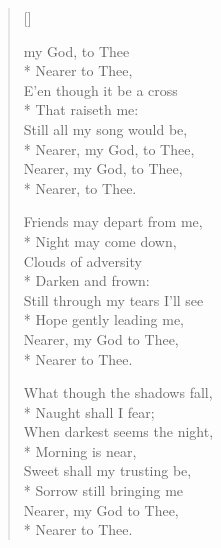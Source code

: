 \newHymn


\begin{verse}[\versewidth]

\begin{altverse}
 my God, to Thee\\*
Nearer to Thee,\\
E'en though it be a cross\\*
That raiseth me:\\
	Still all my song would be,\\*
	Nearer, my God, to Thee,\\
	Nearer, my God, to Thee,\\*
	Nearer, to Thee.
\end{altverse}

\begin{altverse}
 Friends may depart from me,\\*
Night may come down,\\
Clouds of adversity\\*
Darken and frown:\\
Still through my tears I'll see\\*
Hope gently leading me,\\
Nearer, my God to Thee,\\*
Nearer to Thee.
\end{altverse}

\begin{altverse}
What though the shadows fall,\\*
Naught shall I fear;\\
When darkest seems the night,\\*
Morning is near,\\
Sweet shall my trusting be,\\*
Sorrow still bringing me\\
Nearer, my God to Thee,\\*
Nearer to Thee.
\end{altverse}

\end{verse}

